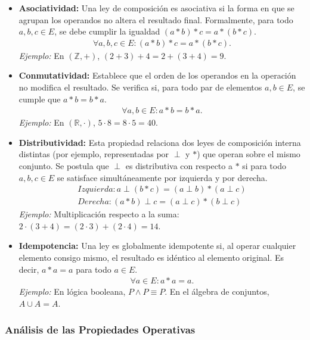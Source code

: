 \documentclass{article}
\begin{document}
\begin{itemize}
    \item \textbf{Asociatividad:} Una ley de composición es asociativa si la forma en que se agrupan los operandos no altera el resultado final. Formalmente, para todo $a, b, c \in E$, se debe cumplir la igualdad $(a * b) * c = a * (b * c)$.
    \begin{align*}    
    \forall a, b, c \in E: (a * b) * c = a * (b * c).
    \end{align*}
    \textit{Ejemplo:} En $(\mathbb{Z}, +)$, $(2 + 3) + 4 = 2 + (3 + 4) = 9$.
    \item \textbf{Conmutatividad:} Establece que el orden de los operandos en la operación no modifica el resultado. Se verifica si, para todo par de elementos $a, b \in E$, se cumple que $a * b = b * a$.
    \begin{align*} 
    \forall a, b \in E: a * b = b * a.
    \end{align*}
    \textit{Ejemplo:} En $(\mathbb{R}, \cdot)$, $5 \cdot 8 = 8 \cdot 5 = 40$.
    \item \textbf{Distributividad:} Esta propiedad relaciona dos leyes de composición interna distintas (por ejemplo, representadas por $\perp$ y $*$) que operan sobre el mismo conjunto. Se postula que $\perp$ es distributiva con respecto a $*$ si para todo $a, b, c \in E$ se satisface simultáneamente por izquierda y por derecha.
    \begin{align*}        
        Izquierda: a \perp (b * c) = (a \perp b) * (a \perp c) \\
        Derecha: (a * b) \perp c = (a \perp c) * (b \perp c)   
    \end{align*}    
    \textit{Ejemplo:} Multiplicación respecto a la suma: $2 \cdot (3 + 4) = (2 \cdot 3) + (2 \cdot 4) = 14$.
    \item \textbf{Idempotencia:} Una ley es globalmente idempotente si, al operar cualquier elemento consigo mismo, el resultado es idéntico al elemento original. Es decir, $a * a = a$ para todo $a \in E$.
    \begin{align*}        
    \forall a \in E: a * a = a.
    \end{align*}    
    \textit{Ejemplo:} En lógica booleana, $P \land P \equiv P$. En el álgebra de conjuntos, $A \cup A = A$.
\end{itemize}


\subsubsection{Análisis de las Propiedades Operativas}
\end{document}
